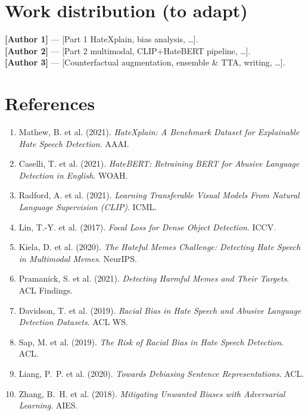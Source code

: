 \documentclass[11pt,a4paper]{article}
\begin{document}
\section*{Work distribution (to adapt)}

\noindent
\textbf{[Author 1]} --- [Part 1 HateXplain, bias analysis, \dots].\\
\textbf{[Author 2]} --- [Part 2 multimodal, CLIP+HateBERT pipeline, \dots].\\
\textbf{[Author 3]} --- [Counterfactual augmentation, ensemble \& TTA, writing, \dots].

\section*{References}

\begin{enumerate}[leftmargin=*]
    \item Mathew, B. et al. (2021). \emph{HateXplain: A Benchmark Dataset for
    Explainable Hate Speech Detection}. AAAI.
    \item Caselli, T. et al. (2021). \emph{HateBERT: Retraining BERT for Abusive
    Language Detection in English}. WOAH.
    \item Radford, A. et al. (2021). \emph{Learning Transferable Visual Models From
    Natural Language Supervision (CLIP)}. ICML.
    \item Lin, T.-Y. et al. (2017). \emph{Focal Loss for Dense Object Detection}.
    ICCV.
    \item Kiela, D. et al. (2020). \emph{The Hateful Memes Challenge: Detecting
    Hate Speech in Multimodal Memes}. NeurIPS.
    \item Pramanick, S. et al. (2021). \emph{Detecting Harmful Memes and Their
    Targets}. ACL Findings.
    \item Davidson, T. et al. (2019). \emph{Racial Bias in Hate Speech and Abusive
    Language Detection Datasets}. ACL WS.
    \item Sap, M. et al. (2019). \emph{The Risk of Racial Bias in Hate Speech
    Detection}. ACL.
    \item Liang, P.~P. et al. (2020). \emph{Towards Debiasing Sentence
    Representations}. ACL.
    \item Zhang, B.~H. et al. (2018). \emph{Mitigating Unwanted Biases with
    Adversarial Learning}. AIES.
\end{enumerate}
\end{document}
